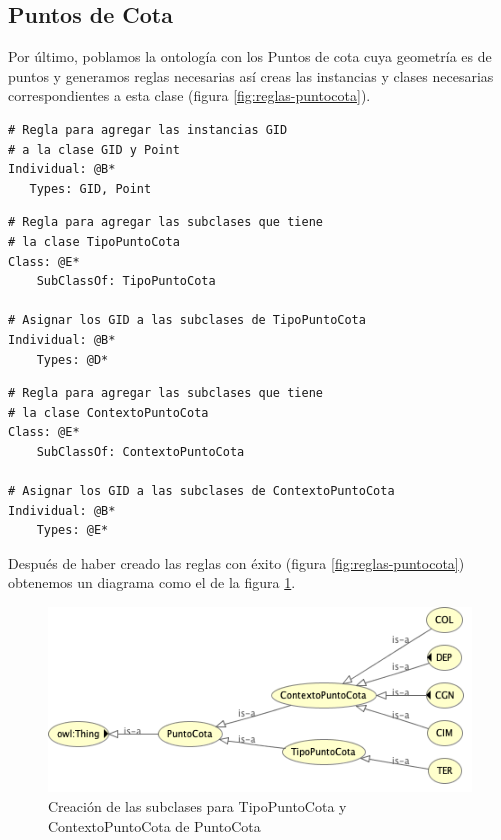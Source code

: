 \subsection{Puntos de Cota}

Por último, poblamos la ontología con los Puntos de cota cuya geometría es de puntos y generamos reglas necesarias así creas las instancias y clases necesarias correspondientes a esta clase (figura \ref{fig:reglas-puntocota}).

\begin{lstlisting}
# Regla para agregar las instancias GID 
# a la clase GID y Point
Individual: @B*
   Types: GID, Point
\end{lstlisting}



\begin{lstlisting}
# Regla para agregar las subclases que tiene 
# la clase TipoPuntoCota 
Class: @E*
	SubClassOf: TipoPuntoCota

# Asignar los GID a las subclases de TipoPuntoCota
Individual: @B*
	Types: @D*
\end{lstlisting}


\begin{lstlisting}
# Regla para agregar las subclases que tiene 
# la clase ContextoPuntoCota 
Class: @E*
	SubClassOf: ContextoPuntoCota

# Asignar los GID a las subclases de ContextoPuntoCota
Individual: @B*
	Types: @E*
\end{lstlisting}



Después de haber creado las reglas con éxito (figura \ref{fig:reglas-puntocota}) obtenemos un diagrama como el de la figura \ref{fig:puntocota-1}.

\begin{figure}[H]
	\centering
	\includegraphics[width=0.7\linewidth]{imagenes/capitulo5/puntocota-1}
	\caption{Creación de las subclases para TipoPuntoCota y ContextoPuntoCota de PuntoCota}
	\label{fig:puntocota-1}
\end{figure}

